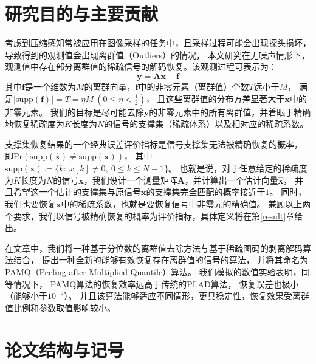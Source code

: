 \documentclass[AutoFakeBold]{LZUThesis}
\begin{document}
\section{研究目的与主要贡献}

考虑到压缩感知常被应用在图像采样的任务中，且采样过程可能会出现探头损坏，导致得到的观测值会出现离群值（Outliers）的情况，
本文研究在无噪声情形下，观测值中存在部分离群值的稀疏信号的解码恢复。该观测过程可表示为：
\begin{equation}
    \mathbf{y} = \mathbf{Ax} + \mathbf{f}
\end{equation}
其中$\mathbf{f}$是一个维数为$M$的离群向量，$\mathbf{f}$中的非零元素（离群值）个数$T$远小于$M$，
满足$\left | \mathrm{supp} (\mathbf{f}) \right | = T = \eta M \ (0 \leq \eta < \frac{1}{2})$，
且这些离群值的分布方差显著大于$\mathbf{x}$中的非零元素。
我们的目标是尽可能去除$\mathbf{y}$的非零元素中的所有离群值，并着眼于精确地恢复稀疏度为$K$长度为$N$的信号的支撑集（稀疏体系）以及相对应的稀疏系数。

支撑集恢复结果的一个经典误差评价指标是信号支撑集无法被精确恢复的概率，
即$\mathrm{Pr}(\mathrm{supp}(\hat{\mathbf{x}}) \neq \mathrm{supp}(\mathbf{x}))$，
其中$\mathrm{supp}(\mathbf{x}) \coloneq \{k:\ x[k] \neq 0,\ 0 \leq k \leq N-1\}$。
也就是说，对于任意给定的稀疏度为$K$长度为$N$的信号$\mathbf{x}$，我们设计一个测量矩阵$\mathbf{A}$，并计算出一个估计向量$\hat{\mathbf{x}}$，
并且希望这一个估计的支撑集与原信号$\mathbf{x}$的支撑集完全匹配的概率接近于$1$。
同时，我们也要恢复$\mathbf{x}$中的稀疏系数，也就是要恢复信号中非零元的精确值。
兼顾以上两个要求，我们以信号被精确恢复的概率为评价指标，具体定义将在第\ref{result}章给出。

在文章中，我们将一种基于分位数的离群值去除方法与基于稀疏图码的剥离解码算法结合，
提出一种全新的能够有效恢复存在离群值的信号的算法，
并将其命名为PAMQ（Peeling after Multiplied Quantile）算法。
我们模拟的数值实验表明，同等情况下，
PAMQ算法的恢复效率远高于传统的PLAD算法，
恢复误差也极小（能够小于$10^{-7}$）。
并且该算法能够适应不同情形，更具稳定性，恢复效果受离群值比例和参数取值影响较小。

\section{论文结构与记号}
\end{document}
